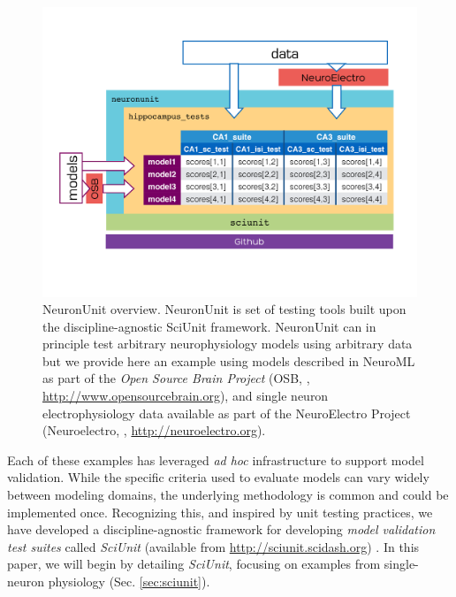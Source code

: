 \documentclass{frontiersSCNS}
\begin{document}
\begin{figure}
\vspace{-45px}
\centering
\includegraphics[scale=0.6]{diagram1.pdf}
\vspace{-65px}
\caption{NeuronUnit overview. NeuronUnit is set of testing tools built upon the discipline-agnostic SciUnit framework. 
NeuronUnit can in principle test arbitrary neurophysiology models using arbitrary data but we provide here an example using models described in NeuroML as part of the \textit{Open Source Brain Project} (OSB, \citep{gleeson_open_2012}, \url{http://www.opensourcebrain.org}), and single neuron electrophysiology data available as part of the NeuroElectro Project (Neuroelectro, \citep{tripathy_neuroelectro:_2012}, \url{http://neuroelectro.org}).}  
\label{fig:sciunit_overview}\vspace{-10px}
\end{figure}
\leavevmode


Each of these examples has leveraged \emph{ad hoc} infrastructure to support model validation. 
While the specific criteria used to evaluate models can vary widely between modeling domains, the underlying methodology is common and could be implemented once. 
Recognizing this, and inspired by unit testing practices, we have developed a discipline-agnostic framework for developing \emph{model validation test suites} called \textit{SciUnit} (available from \url{http://sciunit.scidash.org}) . 
In this paper, we will begin by detailing \textit{SciUnit}, focusing on examples from single-neuron physiology (Sec. \ref{sec:sciunit}). 
\end{document}
